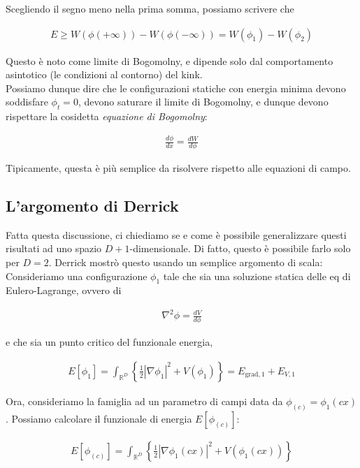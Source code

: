 \documentclass{report}
\begin{document}
Scegliendo il segno meno nella prima somma, possiamo scrivere che 

\begin{align}
    E \geq W(\phi(+\infty)) - W(\phi(-\infty)) = W(\phi_1) - W(\phi_2)
\end{align}

Questo è noto come limite di Bogomolny, e dipende solo dal comportamento asintotico (le condizioni al contorno) del kink. \\

Possiamo dunque dire che le configurazioni statiche con energia minima devono soddisfare \(\phi_t = 0\), devono saturare il limite di Bogomolny, e dunque devono rispettare la cosidetta \emph{equazione di Bogomolny}: 

\begin{align}
    \frac{d\phi}{dx} = \frac{dW}{d\phi}
\end{align}

Tipicamente, questa è più semplice da risolvere rispetto alle equazioni di campo. 

\subsection{L'argomento di Derrick}

Fatta questa discussione, ci chiediamo se e come è possibile generalizzare questi risultati ad uno spazio \(D+1\)-dimensionale. Di fatto, questo è possibile farlo solo per \(D=2\). Derrick mostrò questo usando un semplice argomento di scala: \\

Consideriamo una configurazione \(\phi_1\) tale che sia una soluzione statica delle eq di Eulero-Lagrange, ovvero di 

\begin{align}
    \nabla^2 \phi = \frac{d V}{d\phi}
\end{align}

e che sia un punto critico del funzionale energia, 

\begin{align}
    E[\phi_1] = \int_{\mathbb{R}^D} \left\{\frac{1}{2}|\nabla\phi_1|^2 + V(\phi_1)\right\} = E_{\text{grad}, 1} + E_{V, 1}
\end{align}

Ora, consideriamo la famiglia ad un parametro di campi data da \(\phi_{(c)} = \phi_1(cx)\). Possiamo calcolare il funzionale di energia \(E[\phi_{(c)}]\): 

\begin{align}
    E [\phi_{(c)}] = \int_{\mathbb{R}^D} \left\{\frac{1}{2}|\nabla \phi_1(cx)|^2 + V(\phi_1(cx))\right\}
\end{align}
\end{document}
